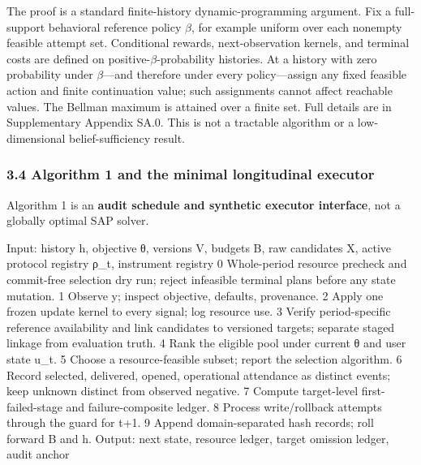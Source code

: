 \documentclass[
  11pt]{article}
\newenvironment{Shaded}{}{}
\newcommand{\NormalTok}[1]{#1}
\newcommand{\Needspace}[1]{%
  \par
  \ifdim\pagegoal>\pagetotal
    \ifdim\dimexpr\pagegoal-\pagetotal\relax<#1\relax
      \newpage
    \fi
  \fi
}
\begin{document}
The proof is a standard finite-history dynamic-programming argument. Fix
a full-support behavioral reference policy \(\beta\), for example
uniform over each nonempty feasible attempt set. Conditional rewards,
next-observation kernels, and terminal costs are defined on
positive-\(\beta\)-probability histories. At a history with zero
probability under \(\beta\)---and therefore under every policy---assign
any fixed feasible action and finite continuation value; such
assignments cannot affect reachable values. The Bellman maximum is
attained over a finite set. Full details are in Supplementary Appendix
SA.0. This is not a tractable algorithm or a low-dimensional
belief-sufficiency result.

\Needspace{30em}

\subsubsection{3.4 Algorithm 1 and the minimal longitudinal
executor}\label{algorithm-1-and-the-minimal-longitudinal-executor}

Algorithm 1 is an \textbf{audit schedule and synthetic executor
interface}, not a globally optimal SAP solver.

\begin{Shaded}
\begin{Highlighting}[]
\NormalTok{Input: history h, objective θ, versions V, budgets B,}
\NormalTok{       raw candidates X, active protocol registry ρ\_t, instrument registry}
\NormalTok{ 0  Whole{-}period resource precheck and commit{-}free selection dry run;}
\NormalTok{    reject infeasible terminal plans before any state mutation.}
\NormalTok{ 1  Observe y; inspect objective, defaults, provenance.}
\NormalTok{ 2  Apply one frozen update kernel to every signal; log resource use.}
\NormalTok{ 3  Verify period{-}specific reference availability and link candidates}
\NormalTok{    to versioned targets; separate staged linkage from evaluation truth.}
\NormalTok{ 4  Rank the eligible pool under current θ and user state u\_t.}
\NormalTok{ 5  Choose a resource{-}feasible subset; report the selection algorithm.}
\NormalTok{ 6  Record selected, delivered, opened, operational attendance as}
\NormalTok{    distinct events; keep unknown distinct from observed negative.}
\NormalTok{ 7  Compute target{-}level first{-}failed{-}stage and failure{-}composite ledger.}
\NormalTok{ 8  Process write/rollback attempts through the guard for t+1.}
\NormalTok{ 9  Append domain{-}separated hash records; roll forward B and h.}
\NormalTok{Output: next state, resource ledger, target omission ledger, audit anchor}
\end{Highlighting}
\end{Shaded}
\end{document}
